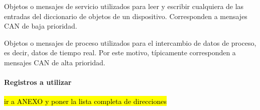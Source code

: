 \begin{tcolorbox}[colback=blue!5!white,colframe=blue!75!black,title=SDO]
	Objetos o mensajes de servicio utilizados para leer y escribir cualquiera de las entradas del diccionario de objetos de un dispositivo.
	Corresponden a mensajes CAN de baja prioridad.
\end{tcolorbox}

\begin{tcolorbox}[colback=blue!5!white,colframe=blue!75!black,title=PDO]
	Objetos o mensajes de proceso utilizados para el
	intercambio de datos de proceso, es decir, datos de tiempo real. Por este motivo,
	típicamente corresponden a mensajes CAN de alta prioridad.
\end{tcolorbox}


\paragraph{Registros a utilizar}
\hl{ir a ANEXO y poner la lista completa de direcciones}

\newpage

